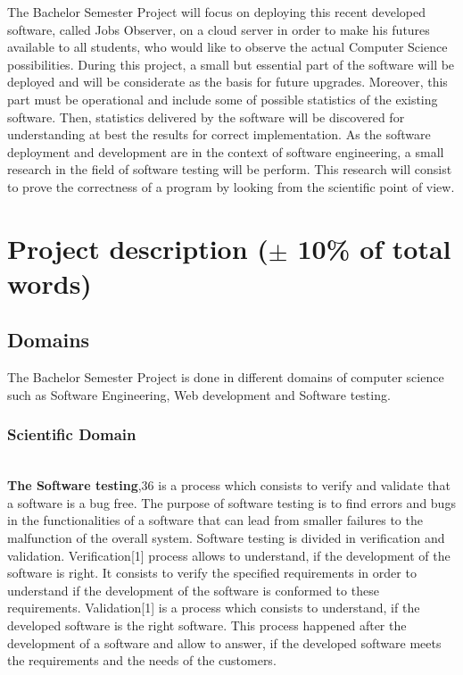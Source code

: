 \documentclass[conference,compsoc]{IEEEtran}
\begin{document}
The Bachelor Semester Project will focus on deploying this recent developed software, called Jobs Observer, on a cloud server in order to make his futures available to all students, who would like to observe the actual Computer Science possibilities.                                                                                                                                   
During this project, a small but essential part of the software will be deployed and will be considerate as the basis for future upgrades. Moreover, this part must be operational and include some of possible statistics of the existing software. Then, statistics delivered by the software will be discovered for understanding at best the results for correct implementation.                                                        
As the software deployment and development are in the context of software engineering, a small research in the field of software testing will be perform. This research will consist to prove the correctness of a program by looking from the scientific point of view. 

\section{Project description ($\pm$ 10\% of total words) }
\subsection{Domains}
The Bachelor Semester Project is done in different domains of computer science such as Software Engineering, Web development and Software testing. 

\subsubsection{Scientific Domain\newline}
\\
{\bf The Software testing},36 is a process which consists to verify and validate that a software is a bug free. The purpose of software testing is to find errors and bugs in the functionalities of a software that can lead from smaller failures to the malfunction of the overall system. Software testing is divided in verification and validation.                                                                                                                             Verification[1] process allows to understand, if the development of the software is right. It consists to verify the specified requirements in order to understand if the development of the software is conformed to these requirements.                                                                                                                           Validation[1] is a process which consists to understand, if the developed software is the right software. This process happened after the development of a software and allow to answer, if the developed software meets the requirements and the needs of the customers. 
                                               
\end{document}
